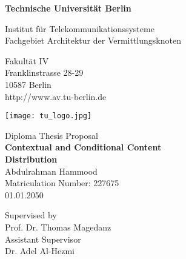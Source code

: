 \thispagestyle{empty}
\begin{center}

\vspace*{1cm}
{\LARGE \textbf{Technische Universität Berlin}}

\vspace{0.5cm}

{\large Institut für Telekommunikationssysteme\\[1mm]}
{\large Fachgebiet Architektur der Vermittlungsknoten\\[5mm]}

Fakultät IV\\
Franklinstrasse 28-29\\
10587 Berlin\\
http://www.av.tu-berlin.de\\
\vspace*{1cm}

\texttt{[image: tu\_logo.jpg]}

\vspace*{1.0cm}

{\LARGE Diploma Thesis Proposal}\\

\vspace{1.0cm}
{\LARGE \textbf{Contextual and Conditional Content}}\\
\vspace*{0.5cm}
{\LARGE \textbf{Distribution}}\\
\vspace*{1.0cm}
{\LARGE Abdulrahman Hammood}
\\
\vspace*{0.5cm}
Matriculation Number: 227675\\
01.01.2050\\ %
\vspace*{0.5cm}

Supervised by\\
Prof. Dr. Thomas Magedanz\\
\vspace*{0.5cm}
Assistant Supervisor\\
Dr. Adel Al-Hezmi
\vspace{2cm}


\end{center}

